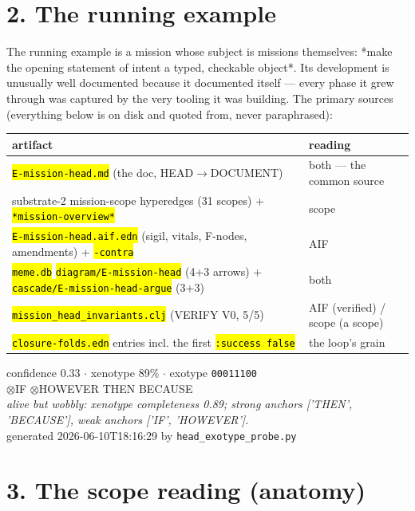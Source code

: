\documentclass[11pt,oneside]{article}
\newcommand{\scopehl}[1]{\texttt{\hl{#1}}}
\begin{document}
\section*{2. The running example}

The running example is a mission whose subject is missions themselves: *make
the opening statement of intent a typed, checkable object*. Its development
is unusually well documented because it documented itself --- every phase it
grew through was captured by the very tooling it was building. The primary
sources (everything below is on disk and quoted from, never paraphrased):

\begin{center}\small\begin{tabularx}{\textwidth}{YY}
\toprule
artifact & reading \\
\midrule
\scopehl{E-mission-head.md} (the doc, HEAD$\rightarrow$DOCUMENT) & both --- the common source \\
substrate-2 mission-scope hyperedges (31 scopes) + \scopehl{*mission-overview*} & scope \\
\scopehl{E-mission-head.aif.edn} (sigil, vitals, F-nodes, amendments) + \scopehl{-contra} & AIF \\
\scopehl{meme.db} \scopehl{diagram/E-mission-head} (4+3 arrows) + \scopehl{cascade/E-mission-head-argue} (3+3) & both \\
\scopehl{mission\_head\_invariants.clj} (VERIFY V0, 5/5) & AIF (verified) / scope (a scope) \\
\scopehl{closure-folds.edn} entries incl. the first \scopehl{:success false} & the loop's grain \\
\bottomrule
\end{tabularx}\end{center}

\begin{vitalsbox}
confidence 0.33 $\cdot$ xenotype 89\% $\cdot$ exotype \texttt{00011100}\\[2pt]$\otimes$\textsf{\small IF} $\otimes$\textsf{\small HOWEVER} \checkmark{}\textsf{\small THEN} \checkmark{}\textsf{\small BECAUSE}\\[3pt]\emph{alive but wobbly: xenotype completeness 0.89; strong anchors ['THEN', 'BECAUSE'], weak anchors ['IF', 'HOWEVER'].}\\[2pt]{\scriptsize generated 2026-06-10T18:16:29 by \texttt{head\_exotype\_probe.py}}
\end{vitalsbox}


\section*{3. The scope reading (anatomy)}
\end{document}

